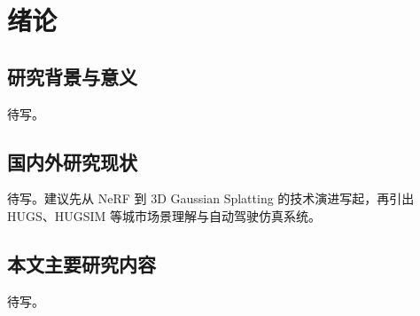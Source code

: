 \chapter{绪论}

\section{研究背景与意义}

待写。

\section{国内外研究现状}

待写。建议先从 NeRF 到 3D Gaussian Splatting 的技术演进写起，再引出 HUGS、HUGSIM 等城市场景理解与自动驾驶仿真系统。

\section{本文主要研究内容}

待写。
